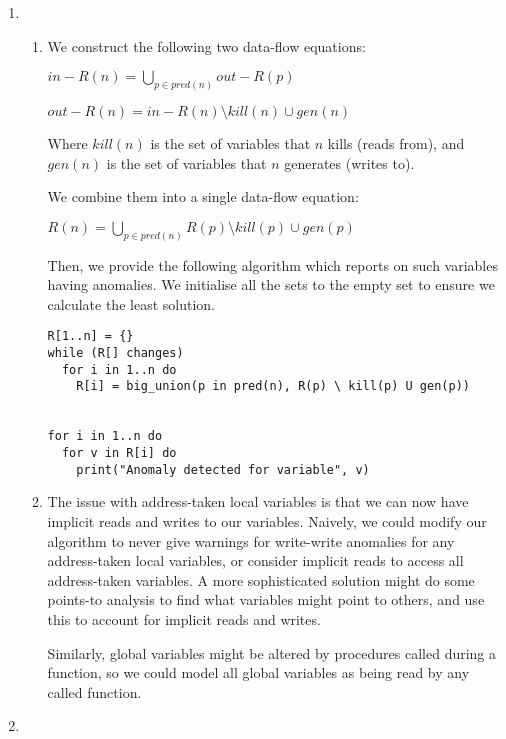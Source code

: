 


\begin{enumerate}[label=(\alph*)]
  \item
    \begin{enumerate}[label=(\roman*)]
      \item

        We construct the following two data-flow equations:

        $in-R(n) = \bigcup_{p \in pred(n)} out-R(p)$

        $out-R(n) = in-R(n) \setminus kill(n) \cup gen(n)$

        Where $kill(n)$ is the set of variables that $n$ kills (reads from), and $gen(n)$ is the set of variables that $n$ generates (writes to).

        We combine them into a single data-flow equation:

        $R(n) = \bigcup_{p \in pred(n)} R(p) \setminus kill(p) \cup gen(p)$

        Then, we provide the following algorithm which reports on such variables having anomalies. We initialise all the sets to the empty set to ensure we calculate the least solution.

\begin{verbatim}
R[1..n] = {}
while (R[] changes)
  for i in 1..n do
    R[i] = big_union(p in pred(n), R(p) \ kill(p) U gen(p))


for i in 1..n do
  for v in R[i] do
    print("Anomaly detected for variable", v)
\end{verbatim}

\item
  The issue with address-taken local variables is that we can now have implicit reads and writes to our variables. Naively, we could modify our algorithm to never give warnings for write-write anomalies for any address-taken local variables, or consider implicit reads to access all address-taken variables. A more sophisticated solution might do some points-to analysis to find what variables might point to others, and use this to account for implicit reads and writes.

  Similarly, global variables might be altered by procedures called during a function, so we could model all global variables as being read by any called function.
        
    \end{enumerate}

  \item
    \begin{enumerate}[label=(\roman*)]


\end{enumerate}
\end{enumerate}
